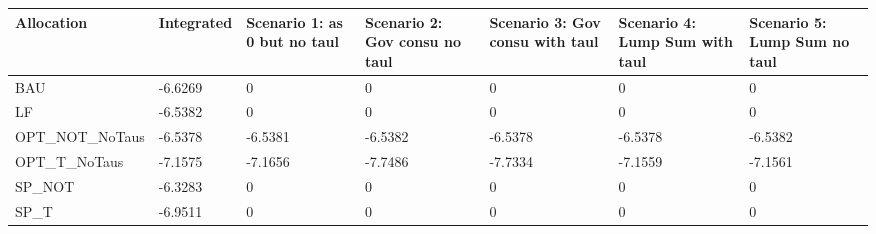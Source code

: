 \begin{tabular}{lllllll}
Allocation & Integrated & Scenario 1: as 0 but no taul & Scenario 2: Gov consu no taul & Scenario 3: Gov consu with taul & Scenario 4: Lump Sum with taul & Scenario 5: Lump Sum no taul \\ 
\hline 
BAU & -6.6269 & 0 & 0 & 0 & 0 & 0 \\ 
LF & -6.5382 & 0 & 0 & 0 & 0 & 0 \\ 
OPT_NOT_NoTaus & -6.5378 & -6.5381 & -6.5382 & -6.5378 & -6.5378 & -6.5382 \\ 
OPT_T_NoTaus & -7.1575 & -7.1656 & -7.7486 & -7.7334 & -7.1559 & -7.1561 \\ 
SP_NOT & -6.3283 & 0 & 0 & 0 & 0 & 0 \\ 
SP_T & -6.9511 & 0 & 0 & 0 & 0 & 0 \\ 
\hline 
\end{tabular}